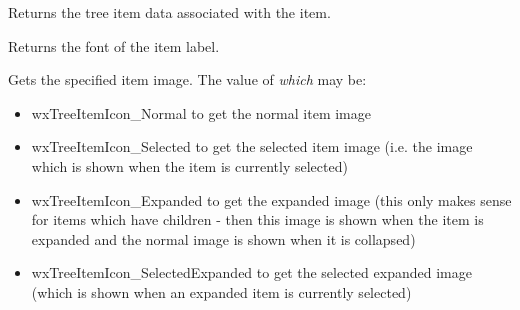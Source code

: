 
Returns the tree item data associated with the item.



%

%

\label{wxtreectrlgetitemfont}


Returns the font of the item label.


\label{wxtreectrlgetitemimage}


Gets the specified item image. The value of {\it which} may be:

\begin{itemize}\itemsep=0pt
\item{wxTreeItemIcon\_Normal} to get the normal item image
\item{wxTreeItemIcon\_Selected} to get the selected item image (i.e. the image
which is shown when the item is currently selected)
\item{wxTreeItemIcon\_Expanded} to get the expanded image (this only
makes sense for items which have children - then this image is shown when the
item is expanded and the normal image is shown when it is collapsed)
\item{wxTreeItemIcon\_SelectedExpanded} to get the selected expanded image
(which is shown when an expanded item is currently selected)
\end{itemize}


